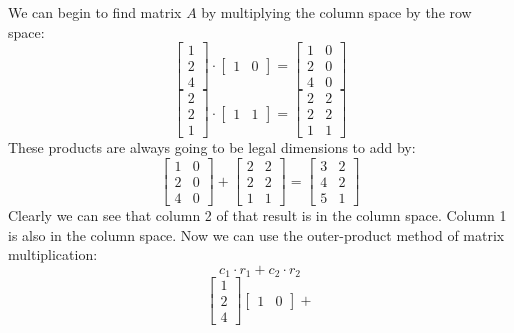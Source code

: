 \documentclass[]{exam}
\begin{document}
\begin{questions}
\begin{solution}
	We can begin to find matrix $A$ by multiplying the column space by the row space:
	\[
		\begin{bmatrix}
			1 \\ 2 \\ 4
		\end{bmatrix} \cdot
		\begin{bmatrix}
			1 & 0
		\end{bmatrix} = 
		\begin{bmatrix}
			1 & 0 \\
			2 & 0 \\
			4 & 0 
		\end{bmatrix}
	\]
	\[
		\begin{bmatrix}
			2 \\ 2 \\ 1
		\end{bmatrix} \cdot 
		\begin{bmatrix}
			1 & 1
		\end{bmatrix} =
		\begin{bmatrix}
			2 & 2 \\
			2 & 2 \\
			1 & 1
		\end{bmatrix}
	\]
	These products are always going to be legal dimensions to add by:
	\[
		\begin{bmatrix}
			1 & 0 \\
			2 & 0 \\
			4 & 0 
		\end{bmatrix} +
		\begin{bmatrix}
			2 & 2 \\
			2 & 2 \\
			1 & 1
		\end{bmatrix} = 
		\begin{bmatrix}
			3 & 2 \\
			4 & 2 \\
			5 & 1
		\end{bmatrix}
	\]
	Clearly we can see that column 2 of that result is in the column space.  Column 1 is also in the column space.
	Now we can use the outer-product method of matrix multiplication:
	\[
		c_1\cdot r_1 + c_2\cdot r_2	
	\]
	\[
		\begin{bmatrix}
			1 \\ 2 \\ 4
		\end{bmatrix}
		\begin{bmatrix}
			1 & 0
		\end{bmatrix} +
\]
\end{solution}
\end{questions}
\end{document}
